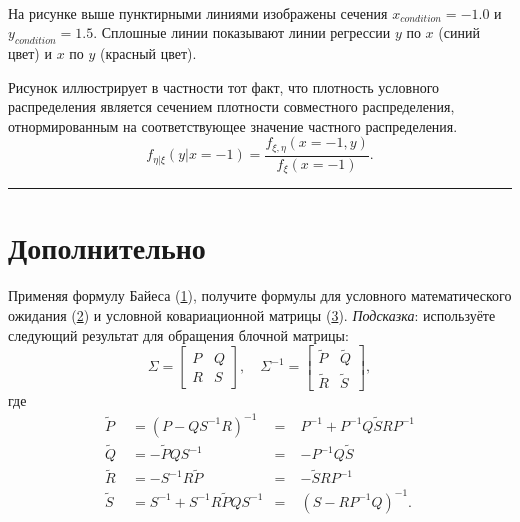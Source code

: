 \documentclass[11pt,a4paper]{article}
\begin{document}
    \begin{center}
    \end{center}
    { \hspace*{\fill} \\}
    
    На рисунке выше пунктирными линиями изображены сечения
\(x_{condition} = -1.0\) и \(y_{condition} = 1.5\).
Сплошные линии показывают линии регрессии \(y\) по \(x\) (синий цвет) и
\(x\) по \(y\) (красный цвет).

    Рисунок иллюстрирует в частности тот факт, что плотность условного
распределения является сечением плотности совместного распределения,
отнормированным на соответствующее значение частного распределения. \[
  f_{\eta|\xi}(y|x=-1) = \frac{f_{\xi,\eta}(x=-1, y)}{f_{\xi}(x=-1)}.
\]

    \begin{center}\rule{0.5\linewidth}{0.5pt}\end{center}

    \hypertarget{ux434ux43eux43fux43eux43bux43dux438ux442ux435ux43bux44cux43dux43e}{%
\section{Дополнительно}\label{ux434ux43eux43fux43eux43bux43dux438ux442ux435ux43bux44cux43dux43e}}

Применяя формулу Байеса (\hyperref[mjx-eqn-eqgp_bayes]{1}), получите
формулы для условного математического ожидания
(\hyperref[mjx-eqn-eqgp_mean]{2}) и условной ковариационной матрицы
(\hyperref[mjx-eqn-eqgp_cov]{3}). \emph{Подсказка}: используёте
следующий результат для обращения блочной матрицы: \[
\Sigma =
\begin{bmatrix}
    P & Q \\
    R & S
\end{bmatrix},
\quad
\Sigma^{-1} =
\begin{bmatrix}
    \tilde{P} & \tilde{Q} \\
    \tilde{R} & \tilde{S}
\end{bmatrix},
\] где \[
\begin{aligned}
    \tilde{P} &\;= \left(P-QS^{-1}R\right)^{-1}     & =\;& P^{-1} + P^{-1}Q\tilde{S}RP^{-1} \\
    \tilde{Q} &\;= -\tilde{P}QS^{-1}                & =\;& -P^{-1}Q\tilde{S} \\
    \tilde{R} &\;= -S^{-1}R\tilde{P}                & =\;& -\tilde{S}RP^{-1}  \\
    \tilde{S} &\;= S^{-1} + S^{-1}R\tilde{P}QS^{-1} & =\;& \left(S-RP^{-1}Q\right)^{-1}.
\end{aligned}
\]
\end{document}
